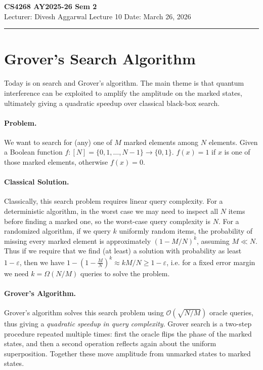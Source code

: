 \noindent
\textbf{CS4268 AY2025-26 Sem 2}
\\
\noindent
Lecturer: Divesh Aggarwal
\hfill
Lecture 10                      %
\hfill
Date: March 26, 2026          %


\noindent
\rule{\textwidth}{1pt}

\medskip


\section{Grover's Search Algorithm}

Today is on search and Grover's algorithm. The main theme is that quantum interference can be exploited to amplify the amplitude on the marked states, ultimately giving a quadratic speedup over classical black-box search.

\paragraph{Problem.} We want to search for (any) one of $M$ marked elements among $N$ elements. Given a Boolean function $f: [N]=\{0,1,\dots,N-1\} \longrightarrow \{0,1\}$. $f(x)=1$ if $x$ is one of those marked elements, otherwise $f(x)=0$.

\paragraph{Classical Solution.} Classically, this search problem requires linear query complexity. For a deterministic algorithm, in the worst case we may need to inspect all $N$ items before finding a marked one, so the worst-case query complexity is $N$. For a randomized algorithm, if we query $k$ uniformly random items, the probability of missing every marked element is approximately $(1-M/N)^k$, assuming $M \ll N$. Thus if we require that we find (at least) a solution with probability as least $1-\varepsilon$, then we have $1-(1-\frac{M}{N})^k \approx kM/N \geq 1-\varepsilon$, i.e. for a fixed error margin we need $k=\Omega(N/M)$ queries to solve the problem. 

\paragraph{Grover's Algorithm.} Grover's algorithm solves this search problem using $\mathcal{O}(\sqrt{N/M})$ oracle queries, thus giving a \textit{quadratic speedup in query complexity}. Grover search is a two-step procedure repeated multiple times: first the oracle flips the phase of the marked states, and then a second operation reflects again about the uniform superposition. Together these move amplitude from unmarked states to marked states.

